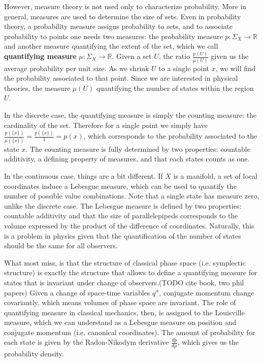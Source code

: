 \documentclass[10pt,twocolumn, nofootinbib]{revtex4-2}
\begin{document}
However, measure theory is not used only to characterize probability. More in general, measures are used to determine the size of sets. Even in probability theory, a probability measure assigns probability to sets, and to associate probability to points one needs two measures: the probability measure $p : \Sigma_X \to \mathbb{R}$ and another measure quantifying the extent of the set, which we call \textbf{quantifying measure} $\mu : \Sigma_X \to \mathbb{R}$. Given a set $U$, the ratio $\frac{p(U)}{\mu(U)}$ given us the average probability per unit size. As we shrink $U$ to a single point $x$, we will find the probability associated to that point. Since we are interested in physical theories, the measure $\mu(U)$ quantifying the number of states within the region $U$.

In the discrete case, the quantifying measure is simply the counting measure: the cardinality of the set. Therefore for a single point we simply have $\frac{p(\{x\})}{\mu(\{x\})} = \frac{p(\{x\})}{1} = p(x)$, which corresponds to the probability associated to the state $x$. The counting measure is fully determined by two properties: countable additivity, a defining property of measures, and that each states counts as one.

In the continuous case, things are a bit different. If $X$ is a manifold, a set of local coordinates induce a Lebesgue measure, which can be used to quantify the number of possible value combinations. Note that a single state has measure zero, unlike the discrete case. The Lebesgue measure is defined by two properties: countable additivity and that the size of parallelepipeds corresponds to the volume expressed by the product of the difference of coordinates. Naturally, this is a problem in physics given that the quantification of the number of states should be the same for all observers.

What most miss, is that the structure of classical phase space (i.e. symplectic structure) is exactly the structure that allows to define a quantifying measure for states that is invariant under change of observers.(TODO cite book, two phil papers) Given a change of space-time variables $q^\alpha$, conjugate momentum change covariantly, which means volumes of phase space are invariant. The role of quantifying measure in classical mechanics, then, is assigned to the Louisville measure, which we can understand as a Lebesgue measure on position and conjugate momentum (i.e. canonical coordinates). The amount of probability for each state is given by the Radon-Nikodym derivative $\frac{dp}{d\mu}$, which gives us the probability density.
\end{document}
